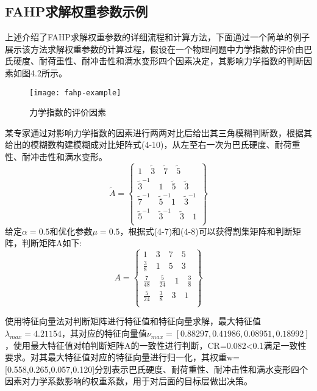 \subsection{FAHP求解权重参数示例}
上述介绍了FAHP求解权重参数的详细流程和计算方法，下面通过一个简单的例子展示该方法求解权重参数的计算过程，假设在一个物理问题中力学指数的评价由巴氏硬度、耐荷重性、耐冲击性和满水变形四个因素决定，其影响力学指数的判断因素如图4.2所示。
\begin{figure}[H] %
	\centering
	\texttt{[image: fahp-example]}
	\caption{力学指数的评价因素}
	\label{fig:xfig1}
\end{figure}
某专家通过对影响力学指数的因素进行两两对比后给出其三角模糊判断数，根据其给出的模糊数构建模糊成对比矩阵式(4-10)，从左至右一次为巴氏硬度、耐荷重性、耐冲击性和满水变形。
\begin{equation}
\widetilde{A} = \left\{\begin{array}{l}
1 \quad \widetilde{3} \quad \widetilde{7} \quad \widetilde{5}  \\
\widetilde{3}^{-1} \quad 1 \quad \widetilde{5} \quad \widetilde{3} \\
\widetilde{7}^{-1} \quad \widetilde{5}^{-1} 1 \quad \widetilde{3}^{-1} \\
\widetilde{5}^{-1} \quad \widetilde{3}^{-1} \quad \widetilde{3} \quad 1 \\
\end{array}\right\}
\end{equation}
给定$\alpha=0.5$和优化参数$\mu=0.5$，根据式(4-7)和(4-8)可以获得割集矩阵和判断矩阵，判断矩阵A如下:
\begin{equation}
A = \left\{\begin{array}{l}
1 \quad 3 \quad 7 \quad 5 \\
\frac{3}{8} \quad 1 \quad 5 \quad 3 \\
\frac{7}{48} \quad \frac{5}{24} \quad 1 \quad \frac{3}{8} \\
\frac{5}{24} \quad \frac{3}{8} \quad 3 \quad 1 \\
\end{array}\right\}
\end{equation}

使用特征向量法对判断矩阵进行特征值和特征向量求解，最大特征值$\lambda_{max}=4.21154$，其对应的特征向量值$\nu_{max}=[0.88297,0.41986,0.08951,0.18992]$，使用最大特征值对帕判断矩阵A的一致性进行判断，CR=0.082<0.1满足一致性要求。对其最大特征值对应的特征向量进行归一化，其权重w=[0.558,0.265,0.057,0.120]分别表示巴氏硬度、耐荷重性、耐冲击性和满水变形四个因素对力学系数影响的权重系数，用于对后面的目标层做出决策。

